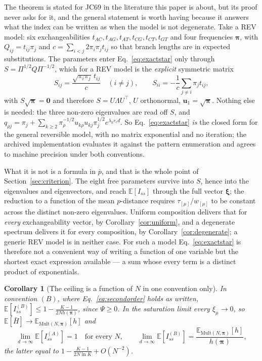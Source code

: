 \documentclass[preprint,12pt,authoryear]{elsarticle}
\newcommand{\Iss}{I_{ss}}
\newcommand{\Hbar}{\bar H}
\newcommand{\bpi}{\boldsymbol{\pi}}
\newcommand{\bxi}{\boldsymbol{\xi}}
\newcommand{\E}{\mathbb{E}}
\newcommand{\Mult}{\mathrm{Mult}}
\newtheorem{corollary}[theorem]{Corollary}
\theoremstyle{definition}
\theoremstyle{remark}
\begin{document}
The theorem is stated for JC69 in the literature this paper is about, but its
proof never asks for it, and the general statement is worth having because it
answers what the index can be written as when the model is not degenerate.
Take a REV model: six exchangeabilities $t_{AC},t_{AG},t_{AT},t_{CG},t_{CT},
t_{GT}$ and four frequencies $\bpi$, with $Q_{ij}=t_{ij}\pi_j$ and
$c=\sum_{i<j}2\pi_i\pi_jt_{ij}$ so that branch lengths are in expected
substitutions. The parameters enter Eq.~\eqref{eq:exactstar} only through
$S=\Pi^{1/2}Q\Pi^{-1/2}$, which for a REV model is the \emph{explicit}
symmetric matrix
\begin{equation}
  S_{ij}=\frac{\sqrt{\pi_i\pi_j}\,t_{ij}}{c}\quad (i\ne j),\qquad
  S_{ii}=-\frac{1}{c}\sum_{j\ne i}\pi_jt_{ij},
  \label{eq:revS}
\end{equation}
with $S\sqrt{\bpi}=\mathbf 0$ and therefore $S=U\Lambda U^{\!\top}$,
$U$ orthonormal, $\mathbf u_1=\sqrt{\bpi}$. Nothing else is needed: the three
non-zero eigenvalues are read off $S$, and
$q_{\rho j}=\pi_j+\sum_{k\ge2}\pi_\rho^{-1/2}u_{k\rho}u_{kj}\pi_j^{1/2}
e^{\lambda_kr_cd}$. So Eq.~\eqref{eq:exactstar} \emph{is} the closed form for
the general reversible model, with no matrix exponential and no iteration; the
archived implementation evaluates it against the pattern enumeration and
agrees to machine precision under both conventions.

What it is not is a formula in $\bar p$, and that is the whole point of
Section~\ref{sec:criterion}. The eight free parameters survive into
$S$, hence into the eigenvalues and eigenvectors, and reach $\E[\Iss]$ through
the full vector $\bxi$; the reduction to a function of the mean $p$-distance
requires $\tau_{[\mu]}/w_{[\mu]}$ to be constant across the distinct non-zero
eigenvalues. Uniform composition delivers that for \emph{every} exchangeability
vector, by Corollary~\ref{cor:uniform}, and a degenerate spectrum delivers it
for every composition, by Corollary~\ref{cor:degenerate}; a generic REV model
is in neither case. For such a model Eq.~\eqref{eq:exactstar} is therefore not
a convenient way of writing a function of one variable but the shortest exact
expression available --- a sum whose every term is a distinct product of
exponentials.

\begin{corollary}[The ceiling is a function of $N$ in one convention only]
\label{cor:ceiling}
In convention $(B)$, where Eq.~\eqref{eq:secondorder} holds as written,
$\E[\Iss^{(B)}]\le1-\frac{K-1}{2Nh(\bpi)}$, since $\Psi\ge0$. In the
saturation limit every $\xi_\mu\to0$, so
$\E[\Hbar]\to\E_{\Mult(N,\bpi)}[h]$ and
\begin{equation}
  \lim_{d\to\infty}\E[\Iss^{(A)}]=1\quad\text{for every }N,
  \qquad
  \lim_{d\to\infty}\E[\Iss^{(B)}]
  =\frac{\E_{\Mult(N,\bpi)}[h]}{h(\bpi)},
\end{equation}
the latter equal to $1-\frac{K-1}{2N\ln K}+O(N^{-2})$.
\end{corollary}
\end{document}
